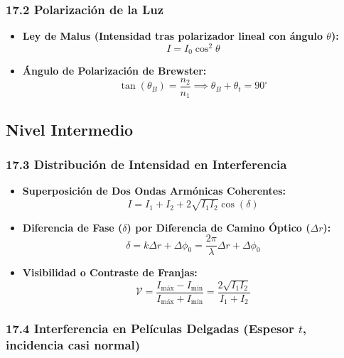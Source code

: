 \documentclass[11pt,a4paper]{article}
\begin{document}
\subsubsection*{17.2 Polarización de la Luz}

\begin{itemize}
  \item \textbf{Ley de Malus (Intensidad tras polarizador lineal con ángulo $\theta$):}
  \[
    I = I_0 \cos^2\theta
  \]
  \item \textbf{Ángulo de Polarización de Brewster:}
  \[
    \tan(\theta_B) = \frac{n_2}{n_1} \implies \theta_B + \theta_t = 90^\circ
  \]
\end{itemize}

\subsection*{Nivel Intermedio}

\subsubsection*{17.3 Distribución de Intensidad en Interferencia}

\begin{itemize}
  \item \textbf{Superposición de Dos Ondas Armónicas Coherentes:}
  \[
    I = I_1 + I_2 + 2\sqrt{I_1 I_2} \cos(\delta)
  \]
  \item \textbf{Diferencia de Fase ($\delta$) por Diferencia de Camino Óptico ($\Delta r$):}
  \[
    \delta = k \Delta r + \Delta\phi_0 = \frac{2\pi}{\lambda} \Delta r + \Delta\phi_0
  \]
  \item \textbf{Visibilidad o Contraste de Franjas:}
  \[
    \mathcal{V} = \frac{I_{\text{máx}} - I_{\text{mín}}}{I_{\text{máx}} + I_{\text{mín}}} = \frac{2\sqrt{I_1 I_2}}{I_1 + I_2}
  \]
\end{itemize}

\subsubsection*{17.4 Interferencia en Películas Delgadas (Espesor $t$, incidencia casi normal)}
\end{document}
